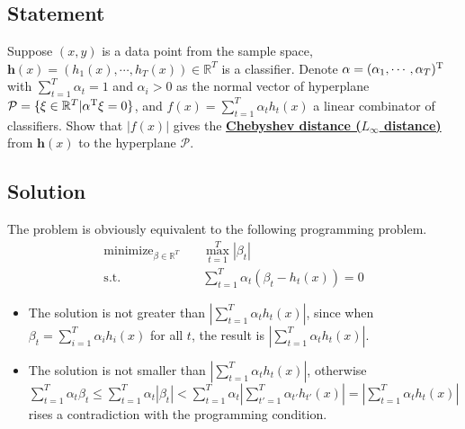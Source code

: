 \documentclass[8pt]{article}
\theoremstyle{compact}
\def\obj#1{\textbf{\uline{#1}}}
\def\le{\leqslant}
\begin{document}
\section{}
\subsection*{Statement}
	Suppose $(x, y)$ is a data point from the sample space, $\mathbf h(x) = (h_1(x), \cdots, h_T(x))\in \mathbb R^T$ is a classifier. Denote $\alpha = (\alpha_1, \cdots, \alpha_T)^{\text T}$ with $\sum_{t=1}^{T}\alpha_t = 1$ and $\alpha_i > 0$ as the normal vector of hyperplane $\mathcal P = \{\xi \in \mathbb R^T | \alpha^{\text T}\xi = 0\}$, and $f(x) = \sum_{t=1}^{T}\alpha_th_t(x)$ a linear combinator of classifiers. Show that $|f(x)|$ gives the \obj{Chebyshev distance ($L_{\infty}$ distance)} from $\mathbf h(x)$ to the hyperplane $\mathcal P$.

\subsection*{Solution}
	The problem is obviously equivalent to the following programming problem.
	\begin{equation*}
		\begin{split}
			\text{minimize}_{\beta \in \mathbb R^T} \quad & \max\limits_{t=1}^{T} |\beta_t|\\
			\text{s.t.} \quad & \sum_{t=1}^{T}\alpha_t(\beta_t - h_t(x)) = 0
		\end{split}
	\end{equation*}

	\begin{itemize}
		\item The solution is not greater than $\left|\sum_{t=1}^{T}\alpha_th_t(x)\right|$, since when $\beta_t = \sum_{i=1}^{T}\alpha_ih_i(x)$ for all $t$, the result is $\left|\sum_{t=1}^{T}\alpha_th_t(x)\right|$.
		\item The solution is not smaller than $\left|\sum_{t=1}^{T}\alpha_th_t(x)\right|$, otherwise $\sum_{t=1}^{T}\alpha_t\beta_t \le \sum_{t=1}^{T}\alpha_t|\beta_t| < \sum_{t=1}^{T}\alpha_t\left|\sum_{t'=1}^{T}\alpha_{t'}h_{t'}(x)\right| = \left|\sum_{t=1}^{T}\alpha_th_t(x)\right|$ rises a contradiction with the programming condition.
	\end{itemize}
\end{document}
